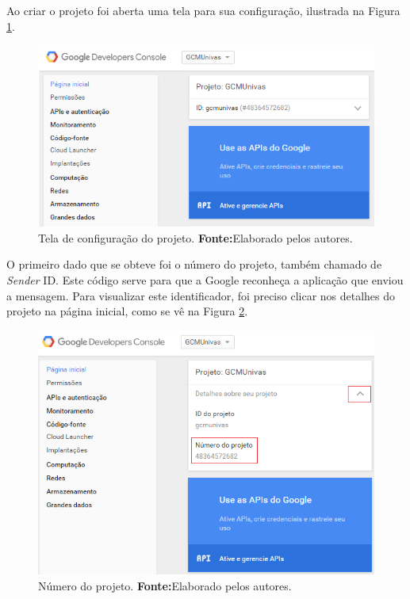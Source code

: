 	\pagebreak
	
	\par Ao criar o projeto foi aberta uma tela para sua configuração, ilustrada na
Figura \ref{fig:gcm2}.

	\begin{figure}[h!] 
		\centerline{\includegraphics[scale=0.7]{./imagens/2_q_metodologico/4_procedimentos_resultados/41_gcm/gcm2.png}}
		\caption[Tela de configuração do projeto]{Tela de configuração do projeto.
		\textbf{Fonte:}Elaborado pelos autores.}
		\label{fig:gcm2}
	\end{figure}
		
	\par O primeiro dado que se obteve foi o número do projeto, também chamado de
\textit{Sender} ID. Este código serve para que a Google reconheça a aplicação
que enviou a mensagem. Para visualizar este identificador, foi preciso clicar
nos detalhes do projeto na página inicial, como se vê na Figura \ref{fig:gcm3}.

	\begin{figure}[h!] 
		\centerline{\includegraphics[scale=0.65]{./imagens/2_q_metodologico/4_procedimentos_resultados/41_gcm/gcm3.png}}
		\caption[Número do projeto]{Número do projeto.
		\textbf{Fonte:}Elaborado pelos autores.}
		\label{fig:gcm3}
	\end{figure}
	

